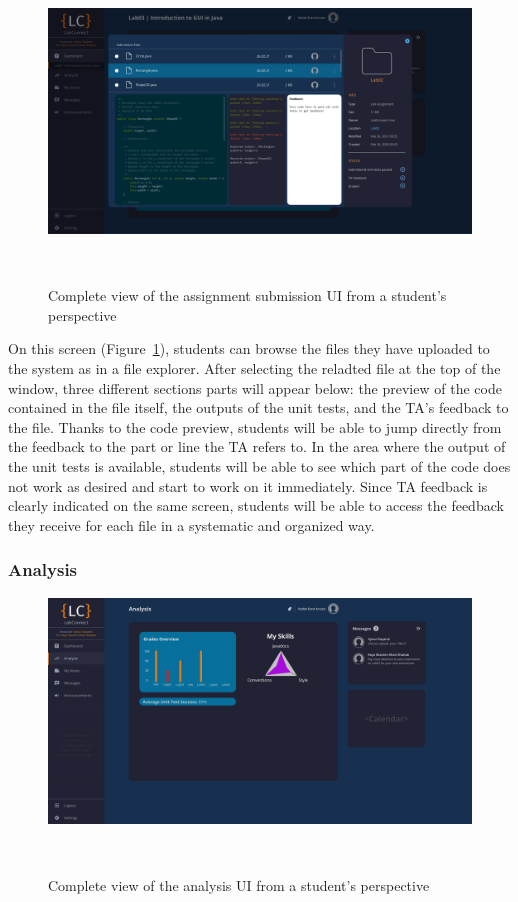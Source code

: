 \documentclass[a4paper, 12pt]{article}
\begin{document}
    \begin{figure}[H]
        \centering
        \includegraphics[width=\textwidth]{student_assignment_submission}
        \caption{Complete view of the assignment submission UI from a student's perspective}~\label{fig:student_assignment_submission_full}
    \end{figure}

    On this screen (Figure~\ref{fig:student_assignment_submission_full}), students can browse the files they have uploaded to the system as in a file explorer.
    After selecting the reladted file at the top of the window, three different sections parts will appear below: the preview of the code contained in the file itself, 
    the outputs of the unit tests, and the TA's feedback to the file. Thanks to the code preview, students will be able to jump directly from the feedback 
    to the part or line the TA refers to. In the area where the output of the unit tests is available, students will be able to see which part of the code does not 
    work as desired and start to work on it immediately. Since TA feedback is clearly indicated on the same screen, students will be able to access the feedback they 
    receive for each file in a systematic and organized way.

    \pagebreak
    
    \subsubsection{Analysis}
    
    \begin{figure}[H]
        \centering
        \includegraphics[width=\textwidth]{student_analysis}
        \caption{Complete view of the analysis UI from a student's perspective}~\label{fig:student_analysis_full}
    \end{figure}
    
\end{document}
